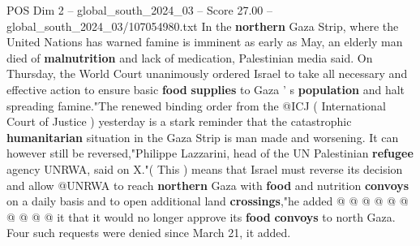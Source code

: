 \begin{textsample}{POS Dim 2 – global\_south\_2024\_03 – Score 27.00 – global\_south\_2024\_03/107054980.txt}
In the \textbf{northern} Gaza Strip, where the United Nations has warned famine is imminent as early as May, an elderly man died of \textbf{malnutrition} and lack of medication, Palestinian media said.
On Thursday, the World Court unanimously ordered Israel to take all necessary and effective action to ensure basic \textbf{food} \textbf{supplies} to Gaza ' s \textbf{population} and halt spreading famine."The renewed binding order from the @ICJ ( International Court of Justice ) yesterday is a stark reminder that the catastrophic \textbf{humanitarian} situation in the Gaza Strip is man made and worsening.
It can however still be reversed,"Philippe Lazzarini, head of the UN Palestinian \textbf{refugee} agency UNRWA, said on X."( This ) means that Israel must reverse its decision and allow @UNRWA to reach \textbf{northern} Gaza with \textbf{food} and nutrition \textbf{convoys} on a daily basis and to open additional land \textbf{crossings},"he added @ @ @ @ @ @ @ @ @ @ it that it would no longer approve its \textbf{food} \textbf{convoys} to north Gaza.
Four such requests were denied since March 21, it added.

\end{textsample}
